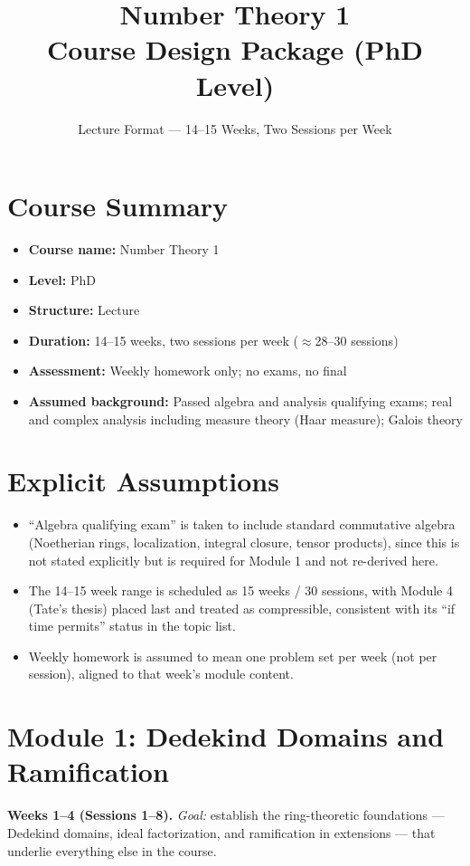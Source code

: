 \documentclass[11pt]{article}
\title{Number Theory 1 \\ \large Course Design Package (PhD Level)}
\author{Lecture Format --- 14--15 Weeks, Two Sessions per Week}
\date{}
\begin{document}
\maketitle
\tableofcontents

\section*{Course Summary}
\begin{itemize}[noitemsep]
  \item \textbf{Course name:} Number Theory 1
  \item \textbf{Level:} PhD
  \item \textbf{Structure:} Lecture
  \item \textbf{Duration:} 14--15 weeks, two sessions per week ($\approx$28--30 sessions)
  \item \textbf{Assessment:} Weekly homework only; no exams, no final
  \item \textbf{Assumed background:} Passed algebra and analysis qualifying exams; real and complex analysis including measure theory (Haar measure); Galois theory
\end{itemize}

\section*{Explicit Assumptions}
\begin{itemize}[noitemsep]
  \item ``Algebra qualifying exam'' is taken to include standard commutative algebra (Noetherian rings, localization, integral closure, tensor products), since this is not stated explicitly but is required for Module 1 and not re-derived here.
  \item The 14--15 week range is scheduled as 15 weeks / 30 sessions, with Module 4 (Tate's thesis) placed last and treated as compressible, consistent with its ``if time permits'' status in the topic list.
  \item Weekly homework is assumed to mean one problem set per week (not per session), aligned to that week's module content.
\end{itemize}

\section{Module 1: Dedekind Domains and Ramification}
\textbf{Weeks 1--4 (Sessions 1--8).} \textit{Goal:} establish the ring-theoretic foundations --- Dedekind domains, ideal factorization, and ramification in extensions --- that underlie everything else in the course.
\end{document}
